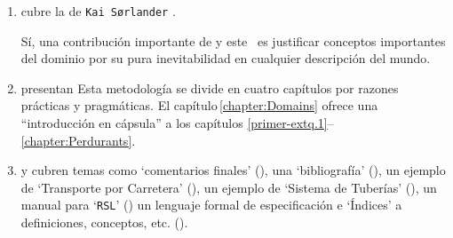 \begin{enumerate}
\item {} cubre la  de
      \texttt{Kai S{\o}rlander}
      \cite{kaisorlander1994,kaisorlander1997,kaisorlander2002,kaisorlander2016,kaisorlander2022}.

      Sí, una contribución importante de \cite{BjornerMonograph2020} y
      este \manual\ es justificar conceptos importantes del dominio por
      su pura inevitabilidad en cualquier descripción del mundo.

\item {} presentan  Esta metodología se divide en cuatro capítulos por razones prácticas
    y pragmáticas. El capítulo\,\ref{chapter:Domains} ofrece una ``introducción
    en cápsula'' a los capítulos\,\,\ref{primer-extq.1}--\ref{chapter:Perdurants}. %
  
\item {}
  y  cubren
  temas como `comentarios finales' (\sort{\ref{chapter:Closing}}), una `bibliografía' (\sort{\ref{primer.bib}}), un ejemplo de `Transporte
  por Carretera' (\sort{\ref{Chapter:Road Transport}}), un ejemplo de `Sistema de Tuberías' (\sort{\ref{appendix:Pipelines}}), un manual para `\texttt{RSL}' (\sort{\ref{RSL-intro}}) un lenguaje formal de especificación  e `Índices' a definiciones, conceptos, etc. (\sort{\ref{primer.indexes}}).
\end{enumerate}

\label{Prerequisite Skills}

